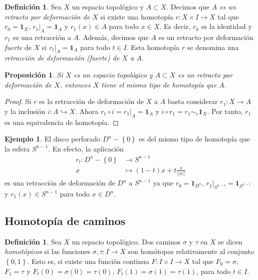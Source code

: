 \documentclass[12pt,a4paper]{book}
\newtheorem{prop}[thm]{Proposición}
\theoremstyle{definition} \newtheorem{defn}[thm]{Definición}
\theoremstyle{definition} \newtheorem{ejemplo}[thm]{Ejemplo}
\theoremstyle{definition} \newtheorem{ejercicio}[thm]{Ejercicio}
\theoremstyle{remark} \newtheorem*{obs}{Observación}
\def\id{\mathbf{1}}
\begin{document}
\begin{defn}
  Sea $X$ un espacio topológico y $A\subset X$. Decimos que \emph{$A$ es un retracto por deformación de $X$} si existe una homotopía $r:X\times I \rightarrow X$ tal que $r_0=\id_X$, $r_1|_A=\id_A$ y $r_1(x)\in A$ para todo $x\in X$. Es decir, $r_0$ es la identidad y $r_1$ es una retracción a $A$. Además, decimos que $A$ es un retracto por deformación \emph{fuerte} de $X$ si $r_t|_A=\id_A$ para todo $t\in I$. Esta homotopía $r$ se denomina una \emph{retracción de deformación (fuerte) de $X$ a $A$}.
\end{defn}

\begin{prop}
  Si $X$ es un espacio topológico y $A\subset X$ es un retracto por deformación de $X$, entonces $X$ tiene el mismo tipo de homotopía que $A$.
\end{prop}
\begin{proof}
  Si $r$ es la retracción de deformación de $X$ a $A$ basta considerar $r_1:X\rightarrow A$ y la inclusión $i:A\hookrightarrow X$. Ahora $r_1\circ i=r_1|_{A}=\id_A$ y $i\circ r_1 = r_1 \sim_r \id_X$. Por tanto, $r_1$ es una equivalencia de homotopía.
\end{proof}

\begin{ejemplo}\label{perforado}
  El disco perforado $D^n-\left\{ 0 \right\}$ es del mismo tipo de homotopía que la esfera $S^{n-1}$. En efecto, la aplicación
  \begin{align*}
    r_t :D^n-\left\{ 0 \right\}&\longrightarrow S^{n-1}\\ 
    x &\longmapsto (1-t)x + t\frac{x}{||x||} 
    \end{align*}
    es una retracción de deformación de $D^n$ a $S^{n-1}$ ya que $r_0=\id_{D^n}$, $r_1|_{S^{n-1}}=\id_{S^{n-1}}$ y $r_1(x)\in S^{n-1}$ para todo $x \in D^n$.
\end{ejemplo}

\subsection{Homotopía de caminos}
\begin{defn}
  Sea $X$ un espacio topológico. Dos caminos $\sigma$ y $\tau$ en $X$ se dicen \emph{homotópicos} si las funciones $\sigma, \tau: I \rightarrow X$ son homótopas relativamente al conjunto $\left\{ 0,1 \right\}$. Esto es, si existe una función continua $F:I\times I \rightarrow X$ tal que $F_0=\sigma$, $F_1=\tau$ y $F_t(0)=\sigma(0)=\tau(0)$, $F_t(1)=\sigma(1)=\tau(1)$, para todo $t \in I$.
\end{defn}
\end{document}
